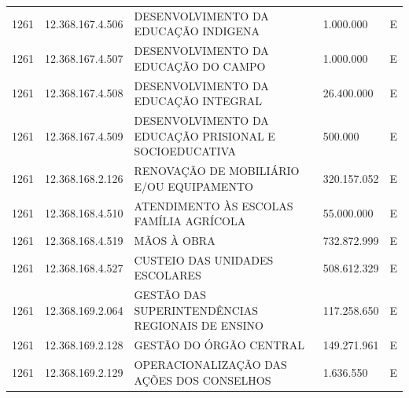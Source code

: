 \documentclass{article}
\begin{document}
\begin{longtable}[c]{m{1cm}|m{2cm}|m{10cm}|m{2cm}|m{1cm}}
\multicolumn{1}{C{1cm}|}{1261} & \multicolumn{1}{C{2cm}|}{12.368.167.4.506} & \multicolumn{1}{L{10cm}|}{DESENVOLVIMENTO DA EDUCAÇÃO INDIGENA} & \multicolumn{1}{R{2cm}|}{1.000.000} & \multicolumn{1}{C{1cm}}{E} \\
\multicolumn{1}{C{1cm}|}{1261} & \multicolumn{1}{C{2cm}|}{12.368.167.4.507} & \multicolumn{1}{L{10cm}|}{DESENVOLVIMENTO DA EDUCAÇÃO DO CAMPO} & \multicolumn{1}{R{2cm}|}{1.000.000} & \multicolumn{1}{C{1cm}}{E} \\
\multicolumn{1}{C{1cm}|}{1261} & \multicolumn{1}{C{2cm}|}{12.368.167.4.508} & \multicolumn{1}{L{10cm}|}{DESENVOLVIMENTO DA EDUCAÇÃO INTEGRAL} & \multicolumn{1}{R{2cm}|}{26.400.000} & \multicolumn{1}{C{1cm}}{E} \\
\multicolumn{1}{C{1cm}|}{1261} & \multicolumn{1}{C{2cm}|}{12.368.167.4.509} & \multicolumn{1}{L{10cm}|}{DESENVOLVIMENTO DA EDUCAÇÃO PRISIONAL E SOCIOEDUCATIVA} & \multicolumn{1}{R{2cm}|}{500.000} & \multicolumn{1}{C{1cm}}{E} \\
\multicolumn{1}{C{1cm}|}{1261} & \multicolumn{1}{C{2cm}|}{12.368.168.2.126} & \multicolumn{1}{L{10cm}|}{RENOVAÇÃO DE MOBILIÁRIO E/OU EQUIPAMENTO} & \multicolumn{1}{R{2cm}|}{320.157.052} & \multicolumn{1}{C{1cm}}{E} \\
\multicolumn{1}{C{1cm}|}{1261} & \multicolumn{1}{C{2cm}|}{12.368.168.4.510} & \multicolumn{1}{L{10cm}|}{ATENDIMENTO ÀS ESCOLAS FAMÍLIA AGRÍCOLA} & \multicolumn{1}{R{2cm}|}{55.000.000} & \multicolumn{1}{C{1cm}}{E} \\
\multicolumn{1}{C{1cm}|}{1261} & \multicolumn{1}{C{2cm}|}{12.368.168.4.519} & \multicolumn{1}{L{10cm}|}{MÃOS À OBRA} & \multicolumn{1}{R{2cm}|}{732.872.999} & \multicolumn{1}{C{1cm}}{E} \\
\multicolumn{1}{C{1cm}|}{1261} & \multicolumn{1}{C{2cm}|}{12.368.168.4.527} & \multicolumn{1}{L{10cm}|}{CUSTEIO DAS UNIDADES ESCOLARES} & \multicolumn{1}{R{2cm}|}{508.612.329} & \multicolumn{1}{C{1cm}}{E} \\
\multicolumn{1}{C{1cm}|}{1261} & \multicolumn{1}{C{2cm}|}{12.368.169.2.064} & \multicolumn{1}{L{10cm}|}{GESTÃO DAS SUPERINTENDÊNCIAS REGIONAIS DE ENSINO} & \multicolumn{1}{R{2cm}|}{117.258.650} & \multicolumn{1}{C{1cm}}{E} \\
\multicolumn{1}{C{1cm}|}{1261} & \multicolumn{1}{C{2cm}|}{12.368.169.2.128} & \multicolumn{1}{L{10cm}|}{GESTÃO DO ÓRGÃO CENTRAL} & \multicolumn{1}{R{2cm}|}{149.271.961} & \multicolumn{1}{C{1cm}}{E} \\
\multicolumn{1}{C{1cm}|}{1261} & \multicolumn{1}{C{2cm}|}{12.368.169.2.129} & \multicolumn{1}{L{10cm}|}{OPERACIONALIZAÇÃO DAS AÇÕES DOS CONSELHOS} & \multicolumn{1}{R{2cm}|}{1.636.550} & \multicolumn{1}{C{1cm}}{E} \\

\end{longtable}
\end{document}
